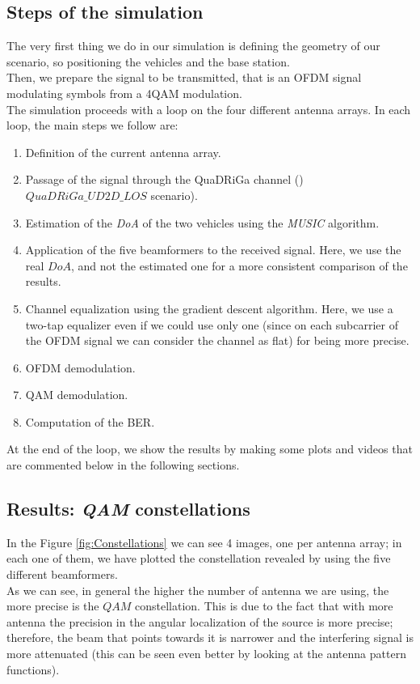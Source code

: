 \subsection{Steps of the simulation}

The very first thing we do in our simulation is defining the geometry of our scenario, so positioning the vehicles and the base station.\\
Then, we prepare the signal to be transmitted, that is an OFDM signal modulating symbols from a 4\-QAM modulation.\\
The simulation proceeds with a loop on the four different antenna arrays. In each loop, the main steps we follow are:

\begin{enumerate}
    \item Definition of the current antenna array.
    \item Passage of the signal through the QuaDRiGa channel ()$QuaDRiGa\_UD2D\_LOS$ scenario).
    \item Estimation of the \textit{DoA} of the two vehicles using the \textit{MUSIC} algorithm.
    \item Application of the five beamformers to the received signal. Here, we use the real $DoA$, and not the estimated one
            for a more consistent comparison of the results.
    \item Channel equalization using the gradient descent algorithm. Here, we use a two-tap equalizer even if we could use only one 
            (since on each subcarrier of the OFDM signal we can consider the channel as flat) for being more precise.
    \item OFDM demodulation.
    \item QAM demodulation.
    \item Computation of the BER.
\end{enumerate}

At the end of the loop, we show the results by making some plots and videos that are commented below in the following sections.

\subsection{Results: \textit{QAM} constellations}

In the Figure \ref{fig:Constellations} we can see 4 images, one per antenna array; in each one of them, we have
plotted the constellation revealed by using the five different beamformers. \\ 
As we can see, in general the higher the number of antenna we are using, the more precise is the $QAM$ constellation. This
is due to the fact that with more antenna the precision in the angular localization of the source is more precise; therefore, 
the beam that points towards it is narrower and the interfering signal is more attenuated (this can be seen even better by
looking at the antenna pattern functions).

